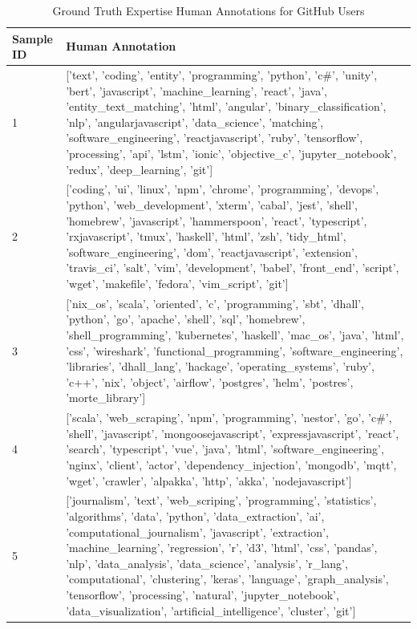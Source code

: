         
        \begin{center}
        \begin{longtable}{|p{1.5cm}|p{12.5cm}|}
        \caption{Ground Truth Expertise Human Annotations for GitHub Users} \label{survey_GH_groundTruth} \\
        \hline
        \textbf{Sample ID} & \textbf{Human Annotation} \\
            \hline
            1 & ['text', 'coding', 'entity', 'programming', 'python', 'c\#', 'unity', 'bert', 'javascript', 'machine\_learning', 'react', 'java', 'entity\_text\_matching', 'html', 'angular', 'binary\_classification', 'nlp', 'angularjavascript', 'data\_science', 'matching', 'software\_engineering', 'reactjavascript', 'ruby', 'tensorflow', 'processing', 'api', 'lstm', 'ionic', 'objective\_c', 'jupyter\_notebook', 'redux', 'deep\_learning', 'git']  \\ 
            2 & ['coding', 'ui', 'linux', 'npm', 'chrome', 'programming', 'devops', 'python', 'web\_development', 'xterm', 'cabal', 'jest', 'shell', 'homebrew', 'javascript', 'hammerspoon', 'react', 'typescript', 'rxjavascript', 'tmux', 'haskell', 'html', 'zsh', 'tidy\_html', 'software\_engineering', 'dom', 'reactjavascript', 'extension', 'travis\_ci', 'salt', 'vim', 'development', 'babel', 'front\_end', 'script', 'wget', 'makefile', 'fedora', 'vim\_script', 'git']  \\ 
            3 & ['nix\_os', 'scala', 'oriented', 'c', 'programming', 'sbt', 'dhall', 'python', 'go', 'apache', 'shell', 'sql', 'homebrew', 'shell\_programming', 'kubernetes', 'haskell', 'mac\_os', 'java', 'html', 'css', 'wireshark', 'functional\_programming', 'software\_engineering', 'libraries', 'dhall\_lang', 'hackage', 'operating\_systems', 'ruby', 'c++', 'nix', 'object', 'airflow', 'postgres', 'helm', 'postres', 'morte\_library']  \\ 
            4 & ['scala', 'web\_scraping', 'npm', 'programming', 'nestor', 'go', 'c\#', 'shell', 'javascript', 'mongoosejavascript', 'expressjavascript', 'react', 'search', 'typescript', 'vue', 'java', 'html', 'software\_engineering', 'nginx', 'client', 'actor', 'dependency\_injection', 'mongodb', 'mqtt', 'wget', 'crawler', 'alpakka', 'http', 'akka', 'nodejavascript']  \\ 
            5 & ['journalism', 'text', 'web\_scriping', 'programming', 'statistics', 'algorithms', 'data', 'python', 'data\_extraction', 'ai', 'computational\_journalism', 'javascript', 'extraction', 'machine\_learning', 'regression', 'r', 'd3', 'html', 'css', 'pandas', 'nlp', 'data\_analysis', 'data\_science', 'analysis', 'r\_lang', 'computational', 'clustering', 'keras', 'language', 'graph\_analysis', 'tensorflow', 'processing', 'natural', 'jupyter\_notebook', 'data\_visualization', 'artificial\_intelligence', 'cluster', 'git']  \\ 

\end{longtable}
\end{center}
